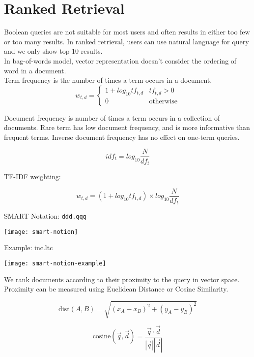 \chapter{Ranked Retrieval}
\begin{multicols*}{2}

\noindent Boolean queries are not suitable for most users and often results in either too few or too many results. In ranked retrieval, users can use natural language for query and we only show top 10 results. \\

\noindent In bag-of-words model, vector representation doesn’t consider the ordering of word in a document.\\

\noindent Term frequency is the number of times a term occurs in a document. \\

$$w_{t,d} = 
\begin{cases}
    1 + log_{10} tf_{t,d} & tf_{t,d} > 0 \\
    0 & \text{otherwise}
\end{cases}
$$

\noindent Document frequency is number of times a term occurs in a collection of documents. Rare term has low document frequency, and is more informative than frequent terms. Inverse document frequency has no effect on one-term queries.

$$idf_t = log_{10} \frac{N}{df_t}$$

\noindent TF-IDF weighting: 

$$w_{t,d} = (1+ log_10 tf_{t,d})\times log_{10} \frac{N}{df_t}$$

\noindent SMART Notation: \verb|ddd.qqq|
\begin{center}
\texttt{[image: smart-notion]}
\end{center}

\noindent Example: inc.ltc
\begin{center}
\texttt{[image: smart-notion-example]}
\end{center}

\noindent We rank documents according to their proximity to the query in vector space. Proximity can be measured using Euclidean Distance or Cosine Similarity.

$$\text{dist}(A,B) = \sqrt{(x_A - x_B)^2 + (y_A - y_B)^2}$$

$$\text{cosine} (\vec{q},\vec{d}) = \frac{\vec{q} \cdot \vec{d}}{|\vec{q}||\vec{d}|}$$

\end{multicols*}
